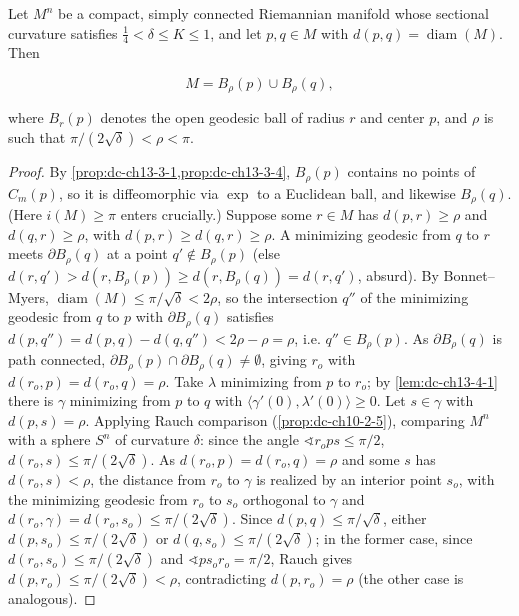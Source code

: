 \begin{lemma}
  \label{lem:dc-ch13-4-2}
  Let $M^n$ be a compact, simply connected Riemannian manifold whose sectional
  curvature satisfies $\tfrac14<\delta\leq K\leq 1$, and let $p,q\in M$ with
  $d(p,q)=\operatorname{diam}(M)$. Then
  
  $$
  M=B_\rho(p)\cup B_\rho(q),
  $$
  
  where $B_r(p)$ denotes the open geodesic ball of radius $r$ and center $p$, and
  $\rho$ is such that $\pi/(2\sqrt\delta)<\rho<\pi$.
\end{lemma}
\begin{proof}
\sketch
  By \cref{prop:dc-ch13-3-1,prop:dc-ch13-3-4}, $B_\rho(p)$ contains no
  points of $C_m(p)$, so it is diffeomorphic via $\exp$ to a Euclidean ball, and
  likewise $B_\rho(q)$. (Here $i(M)\geq\pi$ enters crucially.) Suppose some $r\in M$
  has $d(p,r)\geq\rho$ and $d(q,r)\geq\rho$, with $d(p,r)\geq d(q,r)\geq\rho$. A
  minimizing geodesic from $q$ to $r$ meets $\partial B_\rho(q)$ at a point
  $q'\notin B_\rho(p)$ (else $d(r,q')>d(r,B_\rho(p))\geq d(r,B_\rho(q))=d(r,q')$,
  absurd). By Bonnet–Myers, $\operatorname{diam}(M)\leq\pi/\sqrt\delta<2\rho$, so the
  intersection $q''$ of the minimizing geodesic from $q$ to $p$ with $\partial B_\rho(q)$
  satisfies $d(p,q'')=d(p,q)-d(q,q'')<2\rho-\rho=\rho$, i.e. $q''\in B_\rho(p)$. As
  $\partial B_\rho(q)$ is path connected, $\partial B_\rho(p)\cap\partial B_\rho(q)\neq\emptyset$,
  giving $r_o$ with $d(r_o,p)=d(r_o,q)=\rho$. Take $\lambda$ minimizing from $p$ to
  $r_o$; by \cref{lem:dc-ch13-4-1} there is $\gamma$ minimizing from $p$ to $q$ with
  $\langle\gamma'(0),\lambda'(0)\rangle\geq0$. Let $s\in\gamma$ with $d(p,s)=\rho$.
  Applying Rauch comparison (\cref{prop:dc-ch10-2-5}), comparing $M^n$ with a
  sphere $S^n$ of curvature $\delta$: since the angle
  $\sphericalangle r_o p s\leq\pi/2$, $d(r_o,s)\leq\pi/(2\sqrt\delta)$. As
  $d(r_o,p)=d(r_o,q)=\rho$ and some $s$ has $d(r_o,s)<\rho$, the distance from $r_o$ to
  $\gamma$ is realized by an interior point $s_o$, with the minimizing geodesic from
  $r_o$ to $s_o$ orthogonal to $\gamma$ and
  $d(r_o,\gamma)=d(r_o,s_o)\leq\pi/(2\sqrt\delta)$. Since $d(p,q)\leq\pi/\sqrt\delta$,
  either $d(p,s_o)\leq\pi/(2\sqrt\delta)$ or $d(q,s_o)\leq\pi/(2\sqrt\delta)$; in the
  former case, since $d(r_o,s_o)\leq\pi/(2\sqrt\delta)$ and
  $\sphericalangle p s_o r_o=\pi/2$, Rauch gives $d(p,r_o)\leq\pi/(2\sqrt\delta)<\rho$,
  contradicting $d(p,r_o)=\rho$ (the other case is analogous).
\end{proof}

